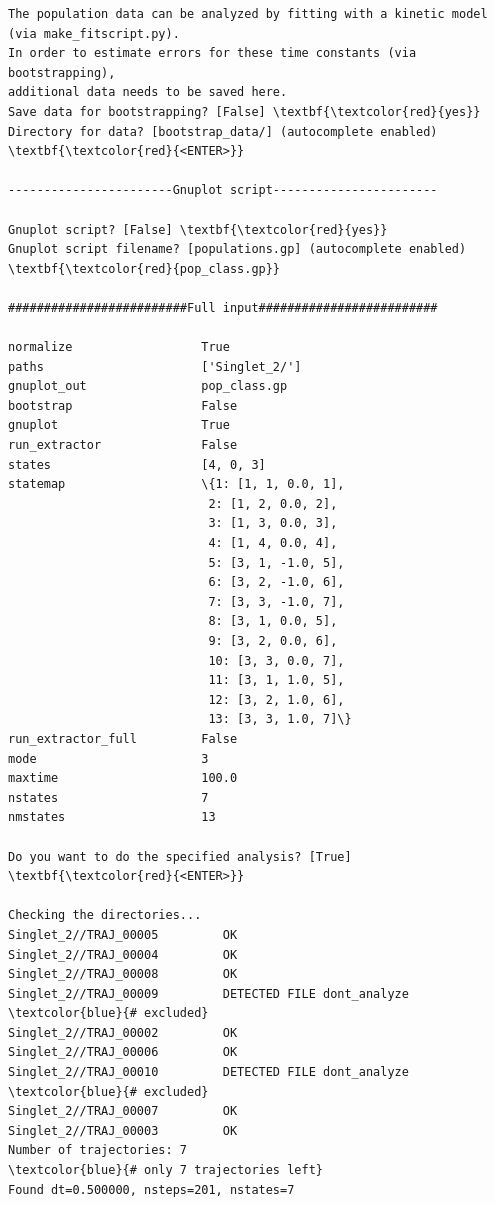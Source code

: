 \documentclass[a4paper,11pt,DIV=15,openany]{scrbook}
\begin{document}
\begin{oframed}
\begin{Verbatim}[commandchars=\\\{\}]
The population data can be analyzed by fitting with a kinetic model (via make_fitscript.py). 
In order to estimate errors for these time constants (via bootstrapping), 
additional data needs to be saved here.
Save data for bootstrapping? [False] \textbf{\textcolor{red}{yes}}
Directory for data? [bootstrap_data/] (autocomplete enabled) \textbf{\textcolor{red}{<ENTER>}}

-----------------------Gnuplot script-----------------------

Gnuplot script? [False] \textbf{\textcolor{red}{yes}}
Gnuplot script filename? [populations.gp] (autocomplete enabled) \textbf{\textcolor{red}{pop_class.gp}}

#########################Full input#########################

normalize                  True
paths                      ['Singlet_2/']
gnuplot_out                pop_class.gp
bootstrap                  False
gnuplot                    True
run_extractor              False
states                     [4, 0, 3]
statemap                   \{1: [1, 1, 0.0, 1], 
                            2: [1, 2, 0.0, 2], 
                            3: [1, 3, 0.0, 3], 
                            4: [1, 4, 0.0, 4], 
                            5: [3, 1, -1.0, 5], 
                            6: [3, 2, -1.0, 6], 
                            7: [3, 3, -1.0, 7], 
                            8: [3, 1, 0.0, 5], 
                            9: [3, 2, 0.0, 6], 
                            10: [3, 3, 0.0, 7], 
                            11: [3, 1, 1.0, 5], 
                            12: [3, 2, 1.0, 6], 
                            13: [3, 3, 1.0, 7]\}
run_extractor_full         False
mode                       3
maxtime                    100.0
nstates                    7
nmstates                   13

Do you want to do the specified analysis? [True] \textbf{\textcolor{red}{<ENTER>}}

Checking the directories...
Singlet_2//TRAJ_00005         OK
Singlet_2//TRAJ_00004         OK
Singlet_2//TRAJ_00008         OK
Singlet_2//TRAJ_00009         DETECTED FILE dont_analyze     \textcolor{blue}{# excluded}
Singlet_2//TRAJ_00002         OK
Singlet_2//TRAJ_00006         OK
Singlet_2//TRAJ_00010         DETECTED FILE dont_analyze     \textcolor{blue}{# excluded}
Singlet_2//TRAJ_00007         OK
Singlet_2//TRAJ_00003         OK
Number of trajectories: 7                                    \textcolor{blue}{# only 7 trajectories left}
Found dt=0.500000, nsteps=201, nstates=7


\end{Verbatim}
\end{oframed}
\end{document}
